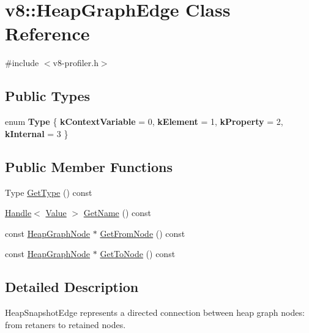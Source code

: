 \hypertarget{classv8_1_1_heap_graph_edge}{}\section{v8\+:\+:Heap\+Graph\+Edge Class Reference}
\label{classv8_1_1_heap_graph_edge}


{\ttfamily \#include $<$v8-\/profiler.\+h$>$}

\subsection*{Public Types}
\begin{DoxyCompactItemize}
\item 
\hypertarget{classv8_1_1_heap_graph_edge_a252500cf4307fe9e4fcb0335a907259b}{}enum {\bfseries Type} \{ {\bfseries k\+Context\+Variable} = 0, 
{\bfseries k\+Element} = 1, 
{\bfseries k\+Property} = 2, 
{\bfseries k\+Internal} = 3
 \}\label{classv8_1_1_heap_graph_edge_a252500cf4307fe9e4fcb0335a907259b}

\end{DoxyCompactItemize}
\subsection*{Public Member Functions}
\begin{DoxyCompactItemize}
\item 
Type \hyperlink{classv8_1_1_heap_graph_edge_a7f4923098074ee4c47d901f363728d08}{Get\+Type} () const 
\item 
\hyperlink{classv8_1_1_handle}{Handle}$<$ \hyperlink{classv8_1_1_value}{Value} $>$ \hyperlink{classv8_1_1_heap_graph_edge_aa91362db6bfdbecfc48d3ba57d292705}{Get\+Name} () const 
\item 
const \hyperlink{classv8_1_1_heap_graph_node}{Heap\+Graph\+Node} $\ast$ \hyperlink{classv8_1_1_heap_graph_edge_acd43a5082f1862b7c0c0094fc75af631}{Get\+From\+Node} () const 
\item 
const \hyperlink{classv8_1_1_heap_graph_node}{Heap\+Graph\+Node} $\ast$ \hyperlink{classv8_1_1_heap_graph_edge_ad8fd8fa121a0e778a8b120a0c5fa227c}{Get\+To\+Node} () const 
\end{DoxyCompactItemize}


\subsection{Detailed Description}
Heap\+Snapshot\+Edge represents a directed connection between heap graph nodes\+: from retaners to retained nodes. 

